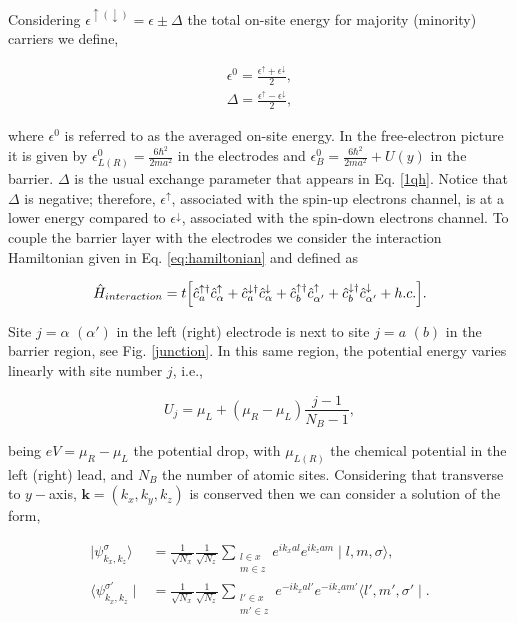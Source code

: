 \documentclass[10pt,prb,showpacs,amssymb,floatfix]{revtex4-1}
\newcommand{\dg}{\dagger}
\newcommand{\dna}{\downarrow}
\newcommand{\upa}{\uparrow}
\newcommand{\alp}{\alpha}
\newcommand{\Dlt}{\Delta}
\newcommand{\eps}{\epsilon}
\newcommand{\sg}{\sigma}
\newcommand{\h}{\hat}
\begin{document}
 Considering $\eps^{\upa(\dna)}=\eps \pm \Dlt $ the total on-site energy for majority (minority) carriers we define,
 
\begin{align}
 \label{avgeps}
  \eps^0 = \frac{\eps^\upa + \eps^\dna }{2}, \\
 \Dlt = \frac{ \eps^\upa - \eps^\dna}{2},
 \label{avgxc}
 \end{align}
 
 where $\eps^0$ is referred to as the averaged on-site energy. In the free-electron picture it is given by $\eps^0_{L(R)} = \frac{6\hbar^2}{2ma^2}$ in the electrodes and $\eps^0_B = \frac{6\hbar^2}{2ma^2} + U (y)$ in the barrier. $\Dlt$ is the usual exchange parameter that appears in Eq. \eqref{1qh}. Notice that $\Dlt$ is negative; therefore, $\eps^\upa$, associated with the spin-up electrons channel, is at a lower energy compared to $\eps^\dna$, associated with the spin-down electrons channel. To couple the barrier layer with the electrodes we consider the interaction Hamiltonian given in Eq. \eqref{eq:hamiltonian} and defined as
 
\begin{align}
\h H_{interaction}=t \Big{[} {\h c}_{a}^{\uparrow \dg}{\h c}_{\alp}^\uparrow + {\h c}_{a}^{\downarrow \dg}{\h c}_{\alp}^\downarrow + {\h c}_{b}^{\uparrow \dg}{\h c}_{\alp'}^\uparrow + {\h c}_{b}^{\downarrow \dg}{\h c}_{\alp'}^\downarrow + h.c. \Big{]}.
\label{eq:int}
\end{align}

Site $j=\alpha$ $(\alpha')$ in the left (right) electrode is next to site $j=a$ $(b)$ in the barrier region, see Fig. \ref{junction}.  In this same region, the potential energy varies linearly  with site number $j$, i.e.,

\begin{equation}
U_j = \mu_L +  (\mu_R - \mu_L) \frac{j-1}{N_B-1},
\label{eq:barepslinear}
\end{equation}

being $eV=\mu_R - \mu_L$ the potential drop, with $\mu_{L(R)}$ the chemical potential in the left (right) lead, and $N_B$ the number of atomic sites. Considering that transverse to $y-$axis, $\bm{k}=(k_x,k_y,k_z)$ is conserved then we can consider a solution of the form,

\begin{align}
\label{eq:bloch1}
\mid \psi_{k_x,k_z}^\sg \rangle &= \frac{1}{\sqrt{N_x}}\frac{1}{\sqrt{N_z}} \sum_{\substack{l\in x\\m\in z}} e^{ik_x a l}  e^{ik_z a m} \mid l,m, \sg \rangle, \\
\langle \psi_{k_x,k_z}^{\sg'} \mid &= \frac{1}{\sqrt{N_x}}\frac{1}{\sqrt{N_z}} \sum_{\substack{l'\in x\\m'\in z}} e^{-ik_x a l'}  e^{-ik_z a m'} \langle l',m', \sg' \mid. 
\label{eq:bloch2}
\end{align}
\end{document}
